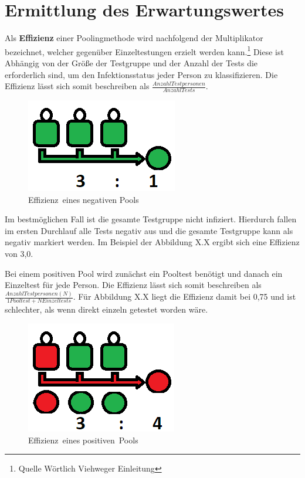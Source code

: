 \section{Ermittlung des Erwartungswertes}
Als \textbf{Effizienz} einer Poolingmethode wird nachfolgend der Multiplikator bezeichnet, welcher gegenüber Einzeltestungen erzielt werden kann.\footnote{Quelle Wörtlich Viehweger Einleitung}
Diese ist Abhängig von der Größe der Testgruppe und der Anzahl der Tests die erforderlich sind, um den Infektionsstatus jeder Person zu klassifizieren.
Die Effizienz lässt sich somit beschreiben als $\frac{Anzahl Testpersonen}{Anzahl Tests} $.
\begin{figure}[h]
	\centering
	\includegraphics[width=.4\textwidth]{img/EffizienzNegativ}
	\caption{\mbox{Effizienz eines} \mbox{negativen} Pools\footnotemark}
\end{figure}
Im bestmöglichen Fall ist die gesamte Testgruppe nicht infiziert.
Hierdurch fallen im ersten Durchlauf alle Tests negativ aus und die gesamte Testgruppe kann als negativ markiert werden.
Im Beispiel der Abbildung X.X ergibt sich eine Effizienz von 3,0.

Bei einem positiven Pool wird zunächst ein Pooltest benötigt und danach ein Einzeltest für jede Person.
Die Effizienz lässt sich somit beschreiben als $\frac{Anzahl Testpersonen (N)}{1 Pooltest + N Einzeltests} $.
Für Abbildung X.X liegt die Effizienz damit bei 0,75 und ist schlechter, als wenn direkt einzeln getestet worden wäre.

\begin{figure}[h]
	\centering
	\includegraphics[width=.4\textwidth]{img/EffizienzPositiv}
	\caption{\mbox{Effizienz eines} \mbox{positiven Pools}\footnotemark}
\end{figure}

